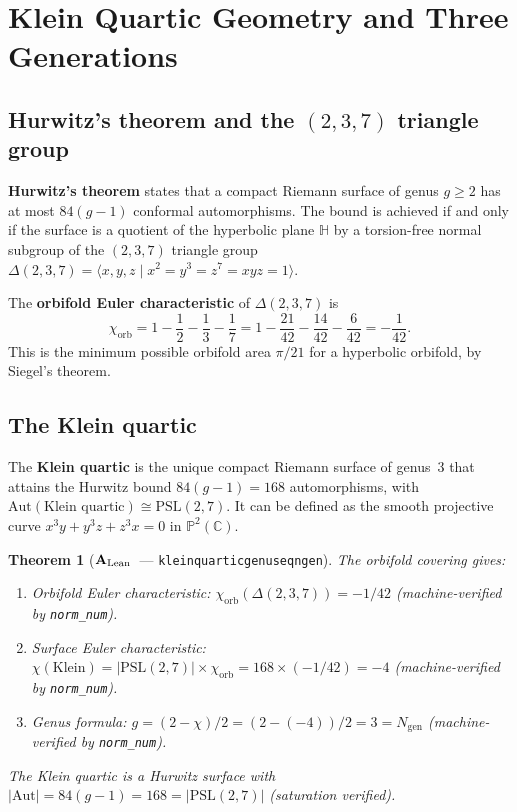 \documentclass[11pt]{article}
\newtheorem{theorem}{Theorem}[section]
\theoremstyle{remark}
\newcommand{\lean}[1]{%
  \penalty-100
  \begingroup\def\_{\textunderscore\allowbreak}\texttt{#1}\endgroup}
\newcommand{\Ngen}{\ensuremath{N_{\mathrm{gen}}}}
\newcommand{\PSLtwo}{\ensuremath{\mathrm{PSL}(2,7)}}
\newcommand{\CatAL}{\ensuremath{\textbf{A}_{\rm Lean}}}
\begin{document}
\section{Klein Quartic Geometry and Three Generations}
\label{sec:klein}

\subsection{Hurwitz's theorem and the \texorpdfstring{$(2,3,7)$}{(2,3,7)} triangle group}

\textbf{Hurwitz's theorem} states that a compact Riemann surface of genus $g \geq 2$
has at most $84(g-1)$ conformal automorphisms.
The bound is achieved if and only if the surface is a quotient of the hyperbolic
plane $\mathbb{H}$ by a torsion-free normal subgroup of the $(2,3,7)$ triangle group
$\Delta(2,3,7) = \langle x,y,z \mid x^2 = y^3 = z^7 = xyz = 1 \rangle$.

The \textbf{orbifold Euler characteristic} of $\Delta(2,3,7)$ is
\begin{equation}
  \chi_{\mathrm{orb}} = 1 - \frac{1}{2} - \frac{1}{3} - \frac{1}{7}
  = 1 - \frac{21}{42} - \frac{14}{42} - \frac{6}{42}
  = -\frac{1}{42}.
\end{equation}
This is the minimum possible orbifold area $\pi/21$ for a hyperbolic orbifold,
by Siegel's theorem.

\subsection{The Klein quartic}

The \textbf{Klein quartic} is the unique compact Riemann surface of genus~3
that attains the Hurwitz bound $84(g-1) = 168$ automorphisms, with
$\mathrm{Aut}(\text{Klein quartic}) \cong \PSLtwo$.
It can be defined as the smooth projective curve
$x^3y + y^3z + z^3x = 0$ in $\mathbb{P}^2(\mathbb{C})$.

\begin{theorem}[\CatAL\ --- \lean{klein\_quartic\_genus\_eq\_n\_gen}]
\label{thm:klein_genus}
The orbifold covering gives:
\begin{enumerate}[label=(\roman*)]
  \item Orbifold Euler characteristic: $\chi_{\mathrm{orb}}(\Delta(2,3,7)) = -1/42$
    (machine-verified by \texttt{norm\_num}).
  \item Surface Euler characteristic: $\chi(\text{Klein}) = |\PSLtwo| \times
    \chi_{\mathrm{orb}} = 168 \times (-1/42) = -4$
    (machine-verified by \texttt{norm\_num}).
  \item Genus formula: $g = (2 - \chi)/2 = (2 - (-4))/2 = 3 = \Ngen$
    (machine-verified by \texttt{norm\_num}).
\end{enumerate}
The Klein quartic is a Hurwitz surface with $|\mathrm{Aut}| = 84(g-1) = 168 =
|\PSLtwo|$ (saturation verified).
\end{theorem}
\end{document}
